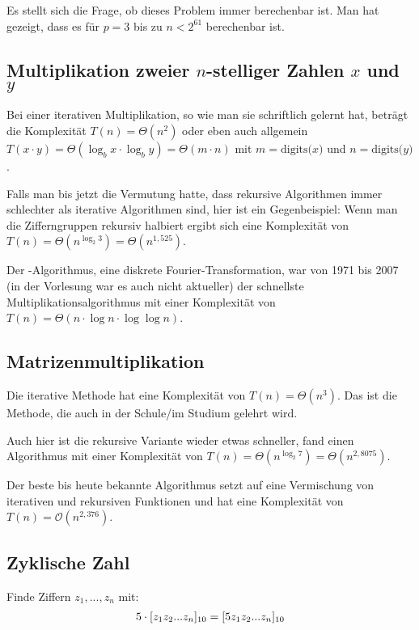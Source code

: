 Es stellt sich die Frage, ob dieses Problem immer berechenbar ist. Man hat gezeigt, dass es für $p=3$ bis zu $n<2^{61}$ berechenbar ist.

\subsection{Multiplikation zweier $n$-stelliger Zahlen $x$ und $y$}

Bei einer iterativen Multiplikation, so wie man sie schriftlich gelernt hat, beträgt die Komplexität $T(n)=\Theta(n^2)$ oder eben auch allgemein $T(x\cdot y)=\Theta(\log_b x\cdot\log_b y)=\Theta(m\cdot n)$ mit $m=\text{digits($x$)}$ und $n=\text{digits($y$)}$.

Falls man bis jetzt die Vermutung hatte, dass rekursive Algorithmen immer schlechter als iterative Algorithmen sind, hier ist ein Gegenbeispiel: Wenn man die Zifferngruppen rekursiv halbiert ergibt sich eine Komplexität von $T(n)=\Theta(n^{\log_2 3})=\Theta(n^{1,525})$.

Der -Algorithmus, eine diskrete Fourier-Transformation, war von 1971 bis 2007 (in der Vorlesung war es auch nicht aktueller) der schnellste Multiplikationsalgorithmus mit einer Komplexität von $T(n)=\Theta(n\cdot\log n\cdot\log\log n)$.

\subsection{Matrizenmultiplikation}

Die iterative Methode hat eine Komplexität von $T(n)=\Theta(n^3)$. Das ist die Methode, die auch in der Schule/im Studium gelehrt wird.

Auch hier ist die rekursive Variante wieder etwas schneller,  fand einen Algorithmus mit einer Komplexität von $T(n)=\Theta(n^{\log_2 7})=\Theta(n^{2,8075})$.

Der beste bis heute bekannte Algorithmus setzt auf eine Vermischung von iterativen und rekursiven Funktionen und hat eine Komplexität von $T(n)=\mathcal{O}(n^{2,376})$.

\subsection{Zyklische Zahl}

Finde Ziffern $z_1,...,z_n$ mit:
\begin{align}
	5\cdot[z_1z_2...z_n]_{10}=[5z_1z_2...z_n]_{10}\notag
\end{align}


